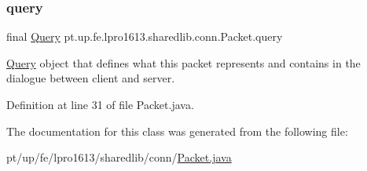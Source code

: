 \subsubsection{\texorpdfstring{query}{query}}
{\footnotesize\ttfamily final \hyperlink{enumpt_1_1up_1_1fe_1_1lpro1613_1_1sharedlib_1_1conn_1_1_query}{Query} pt.\+up.\+fe.\+lpro1613.\+sharedlib.\+conn.\+Packet.\+query}

\hyperlink{enumpt_1_1up_1_1fe_1_1lpro1613_1_1sharedlib_1_1conn_1_1_query}{Query} object that defines what this packet represents and contains in the dialogue between client and server. 

Definition at line 31 of file Packet.\+java.



The documentation for this class was generated from the following file\+:\begin{DoxyCompactItemize}
\item 
pt/up/fe/lpro1613/sharedlib/conn/\hyperlink{_packet_8java}{Packet.\+java}\end{DoxyCompactItemize}
